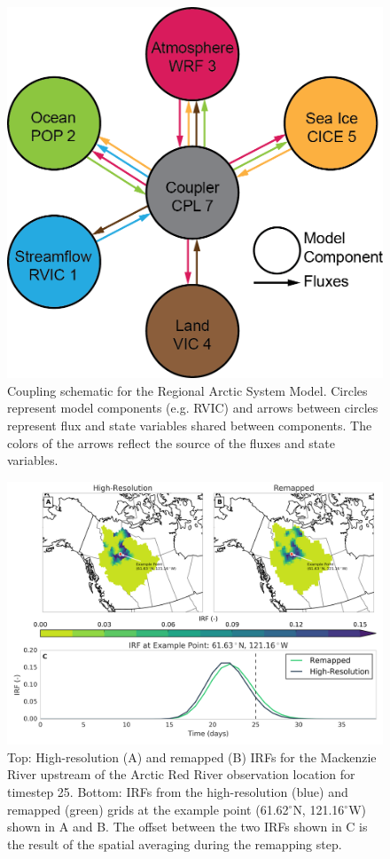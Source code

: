 \documentclass[jgrga, draft]{agutex}
\begin{document}
\clearpage
\begin{figure}
\noindent\includegraphics[width=40pc,natwidth=1]{RASM_coupling_schematic}
\caption{Coupling schematic for the Regional Arctic System Model. Circles represent model components (e.g. RVIC) and arrows between circles represent flux and state variables shared between components. The colors of the arrows reflect the source of the fluxes and state variables.}
\label{fig:rasm_coupling_schematic}
\end{figure}

\clearpage
\begin{figure}
\noindent\includegraphics[width=40pc,natwidth=1]{uh_remap_schematic}
\caption{Top: High-resolution (A) and remapped (B) IRFs for the Mackenzie River upstream of the Arctic Red River observation location for timestep 25.
Bottom: IRFs from the high-resolution (blue) and remapped (green) grids at the example point (61.62$^\circ$N, 121.16$^\circ$W) shown in A and B.
The offset between the two IRFs shown in C is the result of the spatial averaging during the remapping step.}
\label{fig:uh_remap_schematic}
\end{figure}
\end{document}
